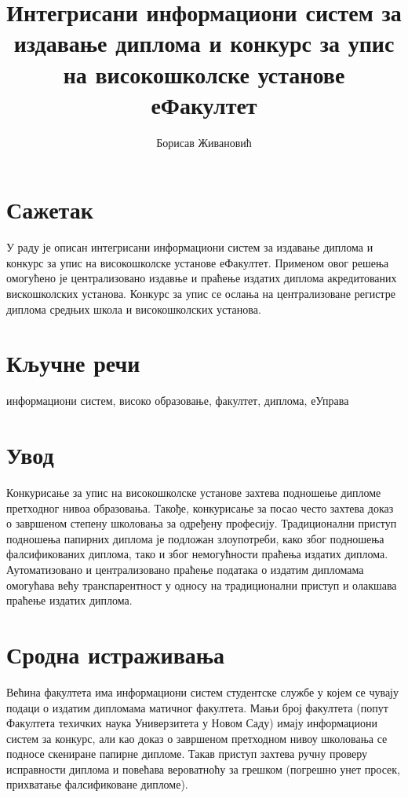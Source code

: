 \documentclass[a4paper]{article}
\title{Интегрисани информациони систем за издавање диплома и конкурс за упис на високошколске установе еФакултет}
\author{Борисав Живановић}
\begin{document}
\maketitle

\large

\section*{Сажетак}

У раду је описан интегрисани информациони систем за издавање диплома и конкурс за упис на високошколске установе еФакултет.
Применом овог решења омогућено је централизовано издавње и праћење издатих диплома акредитованих вискошколских установа.
Конкурс за упис се ослања на централизоване регистре диплома средњих школа и високошколских установа.

\section*{Кључне речи}

информациони систем, високо образовање, факултет, диплома, еУправа

\section*{Увод}

Конкурисање за упис на високошколске установе захтева подношење дипломе претходног нивоа образовања.
Такође, конкурисање за посао често захтева доказ о завршеном степену школовања за одређену професију.
Традиционални приступ подношења папирних диплома је подложан злоупотреби, како због подношења фалсификованих диплома,
тако и због немогућности праћења издатих диплома. Аутоматизовано и централизовано праћење података о издатим дипломама
омогућава већу транспарентност у односу на традиционални приступ и олакшава праћење издатих диплома.

\section*{Сродна истраживања}

Већина факултета има информациони систем студентске службе у којем се чувају подаци о издатим дипломама матичног факултета.
Мањи број факултета (попут Факултета техичких наука Универзитета у Новом Саду) имају информациони систем за конкурс, али
као доказ о завршеном претходном нивоу школовања се подносе скениране папирне дипломе. Такав приступ захтева ручну проверу
исправности диплома и повећава вероватноћу за грешком (погрешно унет просек, прихватање фалсификоване дипломе).
\end{document}
